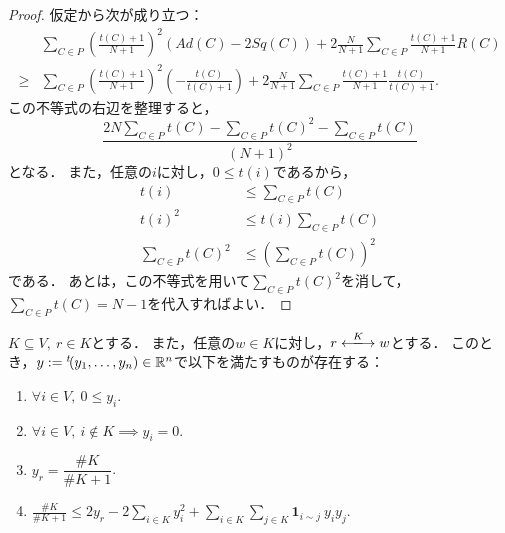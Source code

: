\begin{proof}
  仮定から次が成り立つ：
  \begin{equation}
    \begin{split}
      &\sum_{C \in P} \left( \frac{t(C) + 1}{N + 1} \right) ^ 2 (Ad(C) - 2 Sq(C))
      + 2 \frac{N}{N + 1} \sum_{C \in P} \frac{t(C) + 1}{N + 1} R(C)\\
    \ge{} &\sum_{C \in P} \left( \frac{t(C) + 1}{N + 1} \right) ^ 2 \left( -\frac{t(C)}{t(C) + 1} \right)
      + 2 \frac{N}{N + 1} \sum_{C \in P} \frac{t(C) + 1}{N + 1} \frac{t(C)}{t(C) + 1}.
    \end{split}
  \end{equation}
  この不等式の右辺を整理すると，
  \begin{equation}
    \frac{2 N \sum_{C \in P} t(C) - \sum_{C \in P} t(C) ^ 2 - \sum_{C \in P} t(C)}{(N + 1) ^ 2}
  \end{equation}
  となる．
  また，任意の$i$に対し，$0 \le t(i)$であるから，
  \begin{align}
    t(i) &\le \sum_{C \in P} t(C) \\
    t(i) ^ 2&\le t(i) \sum_{C \in P} t(C) \\
    \sum_{C \in P} t(C) ^ 2 &\le \left( \sum_{C \in P} t(C) \right) ^ 2
  \end{align}
  である．
  あとは，この不等式を用いて$\sum_{C \in P} t(C) ^ 2$を消して，$\sum_{C \in P} t(C) = N - 1$を代入すればよい．
\end{proof}

\begin{lemma}
  \label{lem:branch_energy_strong}
  \leanok
  $K \subseteq V,\ r \in K$とする．
  また，任意の$w \in K$に対し，$r \reach{K} w$とする．
  このとき，$y := {}^t\!(y_1, \ldots, y_n) \in \mathbb{R}^n$で以下を満たすものが存在する：
  \begin{enumerate}[label = (y\arabic*)]
    \item $\forall i \in V,\ 0 \le y_i$. \label{enum:y1}
    \item $\forall i \in V,\ i \notin K \implies y_i = 0$. \label{enum:y2}
    \item $y_r = \dfrac{\# K}{\# K + 1}$. \label{enum:y3}
    \item $\displaystyle \frac{\# K}{\# K + 1} \le 2 y_r - 2 \sum_{i \in K} y_i ^ 2 + \sum_{i \in K} \sum_{j \in K} \bm{1}_{i \sim j}\ y_i y_j$. \label{enum:y4}
  \end{enumerate}
\end{lemma}

